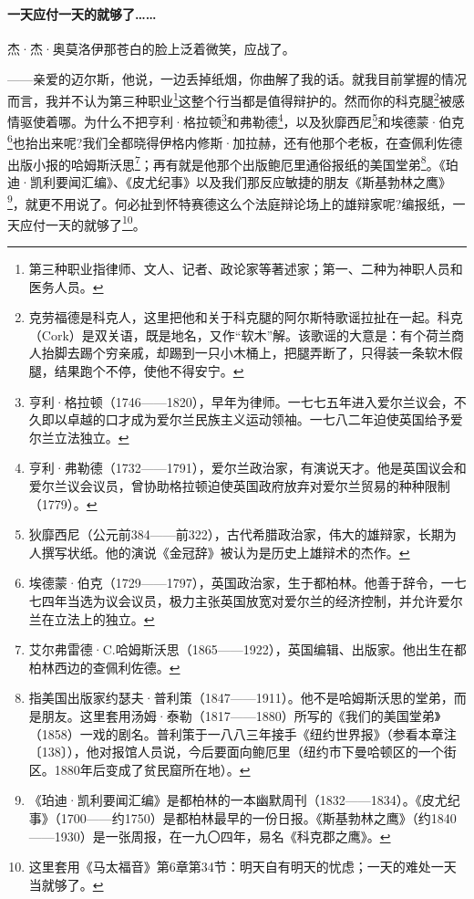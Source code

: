\paragraph*{一天应付一天的就够了……}
\par 杰·杰·奥莫洛伊那苍白的脸上泛着微笑，应战了。
\par ——亲爱的迈尔斯，他说，一边丢掉纸烟，你曲解了我的话。就我目前掌握的情况而言，我并不认为第三种职业\footnote{第三种职业指律师、文人、记者、政论家等著述家；第一、二种为神职人员和医务人员。}这整个行当都是值得辩护的。然而你的科克腿\footnote{克劳福德是科克人，这里把他和关于科克腿的阿尔斯特歌谣拉扯在一起。科克（Cork）是双关语，既是地名，又作“软木”解。该歌谣的大意是：有个荷兰商人抬脚去踢个穷亲戚，却踢到一只小木桶上，把腿弄断了，只得装一条软木假腿，结果跑个不停，使他不得安宁。}被感情驱使着哪。为什么不把亨利·格拉顿\footnote{亨利·格拉顿（1746——1820），早年为律师。一七七五年进入爱尔兰议会，不久即以卓越的口才成为爱尔兰民族主义运动领袖。一七八二年迫使英国给予爱尔兰立法独立。}和弗勒德\footnote{亨利·弗勒德（1732——1791），爱尔兰政治家，有演说天才。他是英国议会和爱尔兰议会议员，曾协助格拉顿迫使英国政府放弃对爱尔兰贸易的种种限制（1779）。}，以及狄靡西尼\footnote{狄靡西尼（公元前384——前322），古代希腊政治家，伟大的雄辩家，长期为人撰写状纸。他的演说《金冠辞》被认为是历史上雄辩术的杰作。}和埃德蒙·伯克\footnote{埃德蒙·伯克（1729——1797），英国政治家，生于都柏林。他善于辞令，一七七四年当选为议会议员，极力主张英国放宽对爱尔兰的经济控制，并允许爱尔兰在立法上的独立。}也抬出来呢?我们全都晓得伊格内修斯·加拉赫，还有他那个老板，在查佩利佐德出版小报的哈姆斯沃思\footnote{艾尔弗雷德·C.哈姆斯沃思（1865——1922），英国编辑、出版家。他出生在都柏林西边的查佩利佐德。}；再有就是他那个出版鲍厄里通俗报纸的美国堂弟\footnote{指美国出版家约瑟夫·普利策（1847——1911）。他不是哈姆斯沃思的堂弟，而是朋友。这里套用汤姆·泰勒（1817——1880）所写的《我们的美国堂弟》（1858）一戏的剧名。普利策于一八八三年接手《纽约世界报》（参看本章注〔138〕），他对报馆人员说，今后要面向鲍厄里（纽约市下曼哈顿区的一个街区。1880年后变成了贫民窟所在地）。}。《珀迪·凯利要闻汇编》、《皮尤纪事》以及我们那反应敏捷的朋友《斯基勃林之鹰》\footnote{《珀迪·凯利要闻汇编》是都柏林的一本幽默周刊（1832——1834）。《皮尤纪事》（1700——约1750）是都柏林最早的一份日报。《斯基勃林之鹰》（约1840——1930）是一张周报，在一九〇四年，易名《科克郡之鹰》。}，就更不用说了。何必扯到怀特赛德这么个法庭辩论场上的雄辩家呢?编报纸，一天应付一天的就够了\footnote{这里套用《马太福音》第6章第34节：明天自有明天的忧虑；一天的难处一天当就够了。}。
